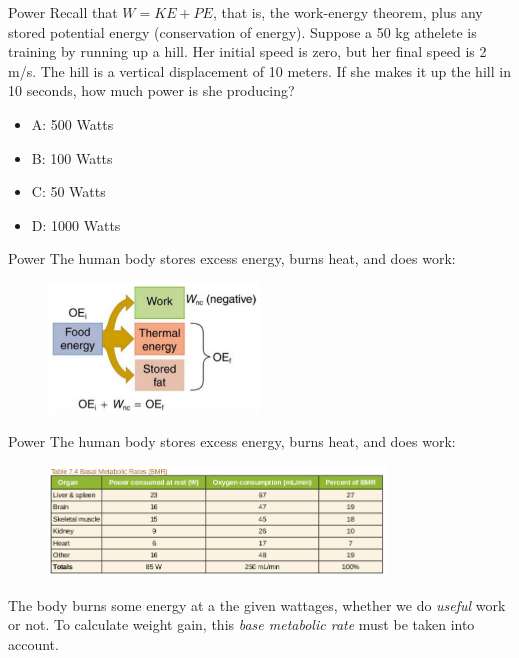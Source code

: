 \documentclass{beamer}
\begin{document}
\begin{frame}{Power}
Recall that $W = KE + PE$, that is, the work-energy theorem, plus any stored potential energy (conservation of energy).  Suppose a 50 kg athelete is training by running up a hill.  Her initial speed is zero, but her final speed is 2 m/s.  The hill is a vertical displacement of 10 meters.  If she makes it up the hill in 10 seconds, how much power is she producing?
\begin{itemize}
\item A: 500 Watts
\item B: 100 Watts
\item C: 50 Watts
\item D: 1000 Watts
\end{itemize}
\end{frame}

\begin{frame}{Power}
The human body stores excess energy, burns heat, and does work:
\begin{figure}
\centering
\includegraphics[width=0.5\textwidth]{figures/body.png}
\end{figure}
\end{frame}

\begin{frame}{Power}
The human body stores excess energy, burns heat, and does work:
\begin{figure}
\centering
\includegraphics[width=0.8\textwidth]{figures/body2.png}
\end{figure}
The body burns some energy at a the given wattages, whether we do \textit{useful} work or not.  To calculate weight gain, this \textit{base metabolic rate} must be taken into account.
\end{frame}
\end{document}
